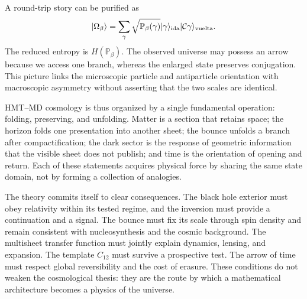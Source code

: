 A round-trip story can be purified as
\[
 |\Omega_\beta\rangle
 =
 \sum_\gamma
 \sqrt{\mathbb P_\beta(\gamma)}
 |\gamma\rangle_{\rm ida}
 |\mathcal C\gamma\rangle_{\rm vuelta}.
\]
The reduced entropy is \(H(\mathbb P_\beta)\). The observed universe may possess
an arrow because we access one branch, whereas the enlarged state preserves
conjugation. This picture links the microscopic particle and antiparticle orientation
with macroscopic asymmetry without asserting that the two scales are
identical.

HMT--MD cosmology is thus organized by a single fundamental operation:
folding, preserving, and unfolding. Matter is a section that retains space; the
horizon folds one presentation into another sheet; the bounce unfolds a branch after
compactification; the dark sector is the response of geometric information that
the visible sheet does not publish; and time is the orientation of opening and return.
Each of these statements acquires physical force by sharing the same state domain,
not by forming a collection of analogies.

The theory commits itself to clear consequences. The black hole exterior must obey relativity within its tested regime, and the inversion must provide a continuation and a signal. The bounce must fix its scale through spin density and remain consistent with nucleosynthesis and the cosmic background. The multisheet transfer function must jointly explain dynamics, lensing, and expansion. The template \(C_{12}\) must survive a prospective test. The arrow of time must respect global reversibility and the cost of erasure. These conditions do not weaken the cosmological thesis: they are the route by which a mathematical architecture becomes a physics of the universe.


